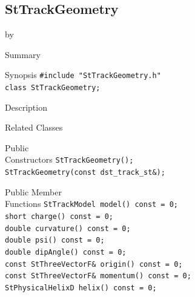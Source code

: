 \documentclass[twoside]{article}
\newcommand{\entrylabel}[1]{\mbox{\textbf{{#1}}}\hfil}%
\newenvironment{entry}
{\begin{list}{}%
    {\renewcommand{\makelabel}{\entrylabel}%
     \setlength{\labelwidth}{90pt}%
     \setlength{\leftmargin}{\labelwidth}
     \advance\leftmargin by \labelsep%
      }%
    }%
  {\end{list}}
\newcommand{\Entrylabel}[1]%
{\raisebox{0pt}[1ex][0pt]{\makebox[\labelwidth][l]%
    {\parbox[t]{\labelwidth}{\hspace{0pt}\textbf{{#1}}}}}}
\newenvironment{Entry}%
{\renewcommand{\entrylabel}{\Entrylabel}\begin{entry}}%
  {\end{entry}}
\begin{document}
\subsection{StTrackGeometry}
\label{sec:StTrackGeometry}
\begin{Entry}
\item[Summary]
\item[Synopsis]
    \verb+#include "StTrackGeometry.h"+\\
    \verb+class StTrackGeometry;+\\
\item[Description]
\item[Related Classes]
\item[Public\\ Constructors]
    \verb+StTrackGeometry();+\\
    \verb+StTrackGeometry(const dst_track_st&);+\\
\item[Public Member\\ Functions]
    \verb+StTrackModel model() const = 0;+\\
    \verb+short charge() const = 0;+\\
    \verb+double curvature() const = 0;+\\
    \verb+double psi() const = 0;+\\
    \verb+double dipAngle() const = 0;+\\
    \verb+const StThreeVectorF& origin() const = 0;+\\
    \verb+const StThreeVectorF& momentum() const = 0;+\\
    \verb+StPhysicalHelixD helix() const = 0;+\\
\end{Entry}
\clearpage
\end{document}

